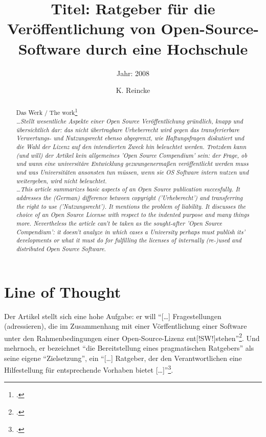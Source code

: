 \documentclass[DIV=calc,BCOR=5mm,11pt,headings=small,oneside,abstract=true, toc=bib]{scrartcl}
\begin{document}

\titlehead{Literaturexzerpt}
\subject{Autor(en): Bretschneider Glaschick Gräfe}
\title{Titel: Ratgeber für die Veröffentlichung von Open-Source-Software durch
eine Hochschule}
\subtitle{Jahr: 2008 }
\author{K. Reincke}

\maketitle

\begin{abstract}
\noindent
Das Werk / The work\footcite[][]{BreGlaGra2008a} \\
\noindent \itshape
\ldots Stellt wesentliche Aspekte einer Open Source Veröffentlichung gründlich,
knapp und übersichtlich dar: das nicht übertragbare Urheberrecht wird gegen das
transferierbare Verwertungs- und Nutzungsrecht ebenso abgegrenzt, wie
Haftungsfragen diskutiert und die Wahl der Lizenz auf den intendierten Zweck hin
beleuchtet werden. Trotzdem kann (und will) der Artikel kein allgemeines 'Open
Source Compendium' sein: der Frage, ob und wann eine universitäre Entwicklung
gezwungenermaßen veröffentlicht werden muss und was Universitäten ansonsten tun
müssen, wenn sie OS Software intern nutzen und weitergeben, wird nicht
beleuchtet.\\
\noindent
\ldots This article summarizes basic aspects of an Open Source publication
succesfully. It addresses the (German) difference between copyright
('Urheberecht') and transferring the right to use ('Nutzungsrecht'). It mentions
the problem of liability. It discusses the choice of an Open Source License with
respect to the indented purpose and many things more. Nevertheless the article
can't be taken as the sought-after 'Open Source Compendium': it doesn't analyze
in which cases a University perhaps must publish its' developments or what it must
do for fulfilling the licenses of internally (re-)used and distributed Open
Source Software.
\end{abstract}
\footnotesize
\normalsize

\section{Line of Thought}

Der Artikel stellt sich eine hohe Aufgabe: er will \enquote{[\ldots]
Fragestellungen (adressieren), die im Zusammenhang mit einer
Vörffentlichung einer Software unter den Rahmenbedingungen einer
Open-Source-Lizenz ent[!SW!]stehen}\footcite[vgl.][167]{BreGlaGra2008a}.
Und mehrnoch, er bezeichnet \enquote{die Bereitstellung eines pragmatischen
Ratgebers} als seine eigene \enquote{Zielsetzung}, ein
\enquote{[\ldots] Ratgeber, der den Verantwortlichen eine Hilfestellung für
entsprechende Vorhaben bietet
[\ldots]}\footcite[vgl.][168]{BreGlaGra2008a}.
\end{document}

